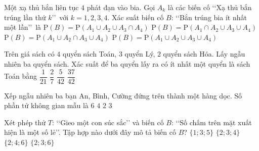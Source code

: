 \begin{ex}%
	Một xạ thủ bắn liên tục $4$ phát đạn vào bia. Gọi $A_k$ là các biến cố \lq\lq  Xạ thủ bắn trúng lần thứ $k$\rq\rq \, với $k=1,2,3,4$. Xác suất biến cố $B$: \lq\lq  Bắn trúng bia ít nhất một lần\rq\rq \, là
	\choice
	{$\mathrm{P}(B)=\mathrm{P}(A_1 \cup A_2 \cup A_3 \cap A_4)$}
	{$\mathrm{P}(B)=\mathrm{P}(A_1 \cap A_2 \cup A_3 \cup A_4)$}
	{$\mathrm{P}(B)=\mathrm{P}(A_1 \cup A_2 \cap A_3 \cup A_4)$}
	{\True $\mathrm{P}(B)=\mathrm{P}(A_1 \cup A_2 \cup A_3 \cup A_4)$}
\end{ex}
\begin{ex}%
	Trên giá sách có $4$ quyển sách Toán, $3$ quyển Lý, $2$ quyển sách Hóa. Lấy ngẫu nhiên ba quyển sách. Xác suất để ba quyển lấy ra có ít nhất một quyển là sách Toán bằng
	\choice
	{$\dfrac{1}{21}$} 
	{$\dfrac{2}{7}$}
	{$\dfrac{5}{42}$}
	{\True $\dfrac{37}{42}$}
\end{ex}
\begin{ex}%
	Xếp ngẫu nhiên ba bạn An, Bình, Cường đứng trên thành một hàng dọc. Số phần tử không gian mẫu là
	\choice
	{\True $6$}
	{$4$}
	{$2$}
	{$3$}	
\end{ex}
\begin{ex}%
	Xét phép thử $T$: \lq\lq  Gieo một con súc sắc\rq\rq\;  và biến cố $B$: \lq\lq  Số chấm trên mặt xuất hiện là một số lẻ\rq\rq. Tập hợp nào dưới đây mô tả biến cố $B$?
	\choice
	{\True $\{1;3;5\}$}
	{$\{2;3;4\}$}
	{$\{2;4;6\}$}
	{$\{2;3;6\}$}	
\end{ex}
